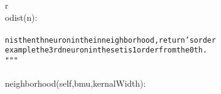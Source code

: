 {{\begin{tabbing}
\hspace{6pt}r\\
\hspace{6pt}odist(n):\\
\\
{\texttt{\hspace{48pt}n\hspace{6pt}is\hspace{6pt}the\hspace{6pt}nth\hspace{6pt}neuron\hspace{6pt}in\hspace{6pt}the\hspace{6pt}in\hspace{6pt}neighborhood,\hspace{6pt}return{'}s\hspace{6pt}order}}\\
{\texttt{\hspace{48pt}example\hspace{6pt}the\hspace{6pt}3rd\hspace{6pt}neuron\hspace{6pt}in\hspace{6pt}the\hspace{6pt}set\hspace{6pt}is\hspace{6pt}1\hspace{6pt}order\hspace{6pt}from\hspace{6pt}the\hspace{6pt}0th.}}\\
{\texttt{\hspace{48pt}\string"}}{\texttt{\string"\string"}}\\
\\
\hspace{6pt}neighborhood(self,bmu,kernalWidth):\\
\\

\end{tabbing}}}
